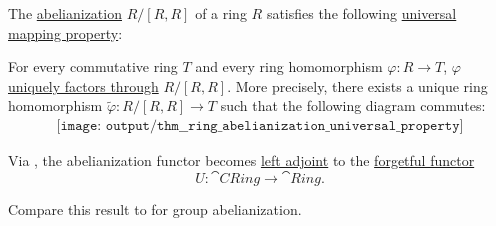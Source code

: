 \begin{theorem}\label{thm:ring_abelianization_universal_property}
  The \hyperref[def:ring_abelianization]{abelianization} \( R / [R, R] \) of a ring \( R \) satisfies the following \hyperref[rem:universal_mapping_property]{universal mapping property}:
  \begin{displayquote}
    For every commutative ring \( T \) and every ring homomorphism \( \varphi: R \to T \), \( \varphi \) \hyperref[def:factors_through]{uniquely factors through} \( R / [R, R] \). More precisely, there exists a unique ring homomorphism \( \widetilde{\varphi}: R / [R, R] \to T \) such that the following diagram commutes:
    \begin{equation}\label{eq:thm:ring_abelianization_universal_property/diagram}
      \begin{aligned}
        \texttt{[image: output/thm\_\_ring\_abelianization\_universal\_property]}
      \end{aligned}
    \end{equation}
  \end{displayquote}
\end{theorem}
\begin{comments}
  \item Via , the abelianization functor becomes \hyperref[def:category_adjunction]{left adjoint} to the \hyperref[def:concrete_category]{forgetful functor}
  \begin{equation*}
    U: \cat{CRing} \to \cat{Ring}.
  \end{equation*}

  \item Compare this result to  for group abelianization.
\end{comments}
